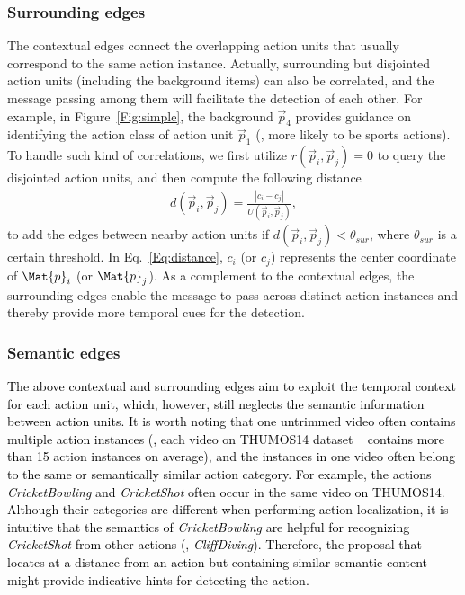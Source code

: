 \documentclass[10pt,journal,compsoc]{IEEEtran}
\def\hao{\textcolor{black}}
\begin{document}
	\subsubsection{Surrounding edges}
	The contextual edges connect the overlapping action units that usually correspond to the same action instance. Actually, surrounding but disjointed action units (including the background items) can also be correlated, and the message passing among them will facilitate the detection of each other. 
	For example, in Figure~\ref{Fig:simple}, the background $\Vec{p}_{4}$ provides guidance on identifying the action class of action unit $\Vec{p}_{1}$ (\eg, more likely to be sports actions).
	To handle such kind of correlations, we first utilize $r(\Vec{p}_{i}, \Vec{p}_{j})=0$ to query the disjointed action units, and then compute the following distance 
	\begin{eqnarray}
	\label{Eq:distance}
	d(\Vec{p}_{i}, \Vec{p}_{j})=\frac{|c_{i}-c_{j}|}{U(\Vec{p}_{i}, \Vec{p}_{j})},
	\end{eqnarray}
	to add the edges between nearby action units if $d(\Vec{p}_{i}, \Vec{p}_{j}) < \theta_{sur}$, where $\theta_{sur}$ is a certain threshold. In Eq.~\eqref{Eq:distance}, $c_{i}$ (or $c_{j}$) represents the center coordinate of $\Mat{p}_i$ (or $\Mat{p}_j$). 
	As a complement to the contextual edges, the surrounding edges enable the message to pass across distinct action instances and thereby provide more temporal cues for the detection. 
	
	
	\subsubsection{Semantic edges}
	\hao{The above contextual and surrounding edges aim to exploit the temporal context for each action unit, which, however, still neglects the semantic information between action units. It is worth noting that one untrimmed video often contains multiple action instances (\eg, each video on THUMOS14 dataset ~\cite{jiang2014thumos} contains more than 15 action instances on average), and the instances in one video often belong to the same or semantically similar action category. 
		For example, the actions \emph{CricketBowling} and \emph{CricketShot} often occur in the same video on THUMOS14. Although their categories are different when performing action localization, it is intuitive that the semantics of \emph{CricketBowling} are helpful for recognizing \emph{CricketShot} from other actions (\eg, \emph{CliffDiving}).
		Therefore, the proposal that locates at a distance from an action but containing similar semantic content might provide indicative hints for detecting the action.}
	
\end{document}
